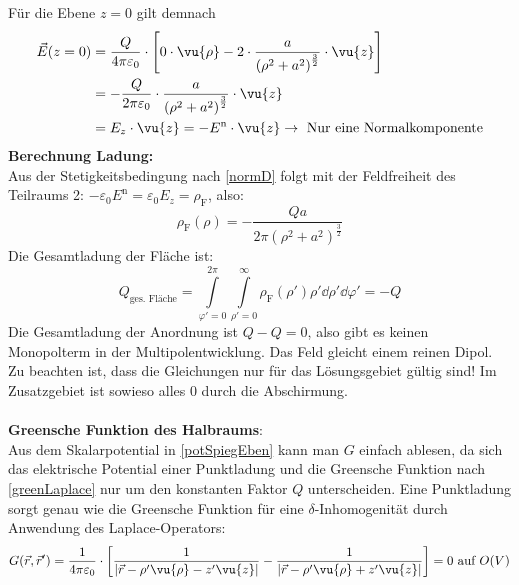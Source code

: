 			  Für die Ebene \(z = 0\) gilt demnach
			        \begin{equation}\begin{split}
					        \vec{E}(z=0) &= \frac{Q}{4\pi\varepsilon_0} \cdot \left[ 0 \cdot \vu{\rho} - 2 \cdot \dfrac{a}{\left( \rho^2 + a^2 \right)^{\frac{3}{2}}} \cdot \vu{z} \right] \\
					        &= -\frac{Q}{2\pi\varepsilon_0} \cdot \dfrac{a}{\left( \rho^2 + a^2 \right)^{\frac{3}{2}}} \cdot \vu{z} \\
					        &= E_z \cdot \vu{z} = -E^\text{n} \cdot \vu{z}   \to \text{ Nur eine Normalkomponente}
				        \end{split}\end{equation}
	  \textbf{Berechnung Ladung:}\\
			   Aus der Stetigkeitsbedingung nach \ref{normD} folgt mit der Feldfreiheit des Teilraums 2:  $- \varepsilon_0E^\text{n} = \varepsilon_0E_z = \rho_\text{F}$, also:
			        \begin{equation}
				        \rho_\text{F}(\rho) = -\dfrac{ Q a}{2 \pi  \left( \rho^2 + a^2 \right)^{\frac{3}{2}}}
			        \end{equation}
			  Die Gesamtladung der Fläche ist:
			        \begin{equation}
				        Q_\text{ges. Fläche} = \int\limits_{\varphi'=0}^{2 \pi} \int\limits_{\rho'=0}^{\infty} \rho_\text{F}(\rho') \rho' \dd{}{\rho'} \dd{}{\varphi'} = - Q
			        \end{equation}
			   Die Gesamtladung der Anordnung ist $Q-Q=0$, also gibt es keinen Monopolterm in der Multipolentwicklung. Das Feld gleicht einem reinen Dipol. Zu beachten ist, dass die Gleichungen nur für das Lösungsgebiet gültig sind! Im Zusatzgebiet ist sowieso alles 0 durch die Abschirmung.\\\\
	  \textbf{Greensche Funktion des Halbraums}:\\
			  Aus dem Skalarpotential in \ref{potSpiegEben} kann man $G$ einfach ablesen, da sich das elektrische Potential einer Punktladung und die Greensche Funktion nach \ref{greenLaplace} nur um den konstanten Faktor $Q$ unterscheiden. Eine Punktladung sorgt genau wie die Greensche Funktion für eine $\delta$-Inhomogenität durch Anwendung des Laplace-Operators:
			        \begin{equation}\label{GreenEbene}
				        G(\vec{r} , \vec{r}' ) = \frac{1}{4\pi\varepsilon_0} \cdot \left[
				        \dfrac{1}{|\vec{r}  - \rho' \vu{\rho} - z' \vu{z} |} -
				        \dfrac{1}{|\vec{r}  -\rho' \vu{\rho} + z' \vu{z}|}
				        \right] = 0 \text{ auf } O(V)
			        \end{equation}
